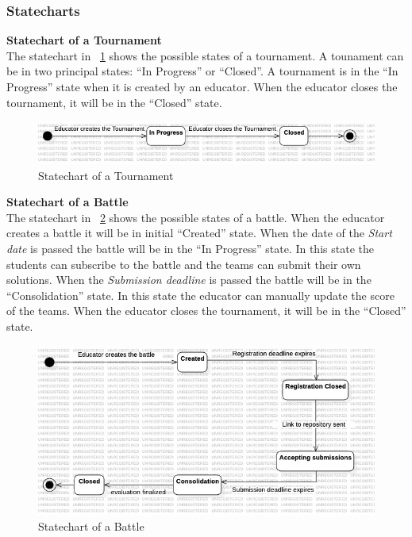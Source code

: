 \subsubsection{Statecharts}

\textbf{Statechart of a Tournament} \\
The statechart in \figurename~\ref{fig:statechart_tournament} shows the possible states of a tournament. A tounament can be in two principal states: ``In Progress'' or ``Closed''. A tournament is in the ``In Progress'' state when it is created by an educator. When the educator closes the tournament, it will be in the ``Closed'' state.
\begin{figure}[H]
    \centering
    \includegraphics[width=1\textwidth]{Diagrams/TournamentStateChart.jpg}
    \caption{Statechart of a Tournament}
    \label{fig:statechart_tournament}
\end{figure}
\textbf{Statechart of a Battle} \\
The statechart in \figurename~\ref{fig:statechart_battle} shows the possible states of a battle. When the educator creates a battle it will be in initial ``Created'' state. When the date of the \textit{Start date} is passed the battle will be in the ``In Progress'' state. In this state the students can subscribe to the battle and the teams can submit their own solutions. When the \textit{Submission deadline} is passed the battle will be in the ``Consolidation'' state. In this state the educator can manually update the score of the teams. When the educator closes the tournament, it will be in the ``Closed'' state.
\begin{figure}[H]
    \centering
    \includegraphics[width=1\textwidth]{Diagrams/BattleStateChart.jpg}
    \caption{Statechart of a Battle}
    \label{fig:statechart_battle}
\end{figure}

